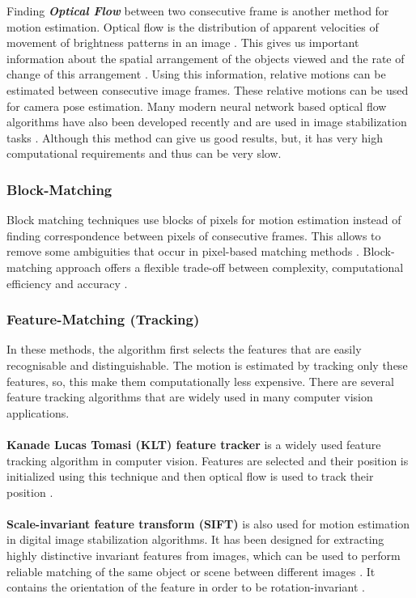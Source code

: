 Finding  \textbf{\textit{Optical Flow}} between two consecutive frame is another method for motion estimation. Optical flow is the distribution of apparent velocities of movement of brightness patterns in an image \citep{horn1981determining}. This gives us important information about the spatial arrangement of the objects viewed and the rate of change of this arrangement \citep{gibson1977analysis}. Using this information, relative motions can be estimated between consecutive image frames. These relative motions can be used for camera pose estimation. Many modern neural network based optical flow algorithms have also been developed recently and are used in image stabilization tasks \citep{deep_opti_stab}. Although this method can give us good results, but, it has very high computational requirements and thus can be very slow.

\subsubsection{Block-Matching}
Block matching techniques use blocks of pixels for motion estimation instead of finding correspondence between pixels of consecutive frames. This allows to remove some ambiguities that occur in pixel-based matching methods \citep{dis_review}. Block-matching approach offers a flexible trade-off between complexity, computational efficiency and accuracy \citep{dis_review}.

\subsubsection{Feature-Matching (Tracking)}
In these methods, the algorithm first selects the features that are easily recognisable and distinguishable. The motion is estimated by tracking only these features, so, this make them computationally less expensive. There are several feature tracking algorithms that are widely used in many computer vision applications.

\paragraph{}\textbf{Kanade Lucas Tomasi (KLT) feature tracker} \citep{tomasi1991detection} is a widely used feature tracking algorithm in computer vision. Features are selected and their position is initialized using this technique and then optical flow is used to track their position \citep{dis_review}.

\paragraph{}\textbf{Scale-invariant feature transform (SIFT)} is also used for motion estimation in digital image stabilization algorithms.  It has been designed for extracting highly distinctive invariant features from images, which can be used to perform reliable matching of the same object or scene between different images \citep{battiato2007sift}. It contains the orientation of the feature in order to be rotation-invariant \citep{dis_review}.

